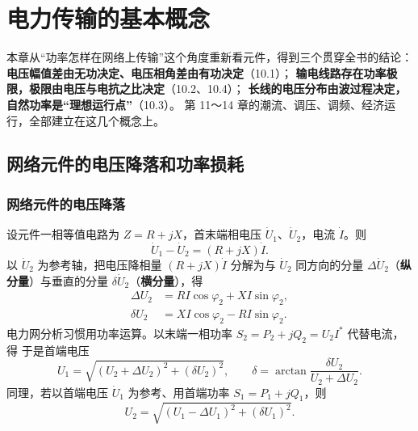 
\chapter{电力传输的基本概念}

本章从“功率怎样在网络上传输”这个角度重新看元件，得到三个贯穿全书的结论：
\textbf{电压幅值差由无功决定、电压相角差由有功决定}（10.1）；
\textbf{输电线路存在功率极限，极限由电压与电抗之比决定}（10.2、10.4）；
\textbf{长线的电压分布由波过程决定，自然功率是“理想运行点”}（10.3）。
第 11～14 章的潮流、调压、调频、经济运行，全部建立在这几个概念上。

\section{网络元件的电压降落和功率损耗}

\subsection{网络元件的电压降落}

设元件一相等值电路为 $Z=R+jX$，首末端相电压 $\dot U_1$、$\dot U_2$，电流 $\dot I$。则
\begin{equation}
  \dot U_1-\dot U_2=(R+jX)\dot I .
\end{equation}
以 $\dot U_2$ 为参考轴，把电压降相量 $(R+jX)\dot I$ 分解为与 $\dot U_2$ 同方向的分量
$\Delta\dot U_2$（\textbf{纵分量}）与垂直的分量 $\delta\dot U_2$（\textbf{横分量}），得
\begin{align}
  \Delta U_2&=RI\cos\varphi_2+XI\sin\varphi_2,\\
  \delta U_2&=XI\cos\varphi_2-RI\sin\varphi_2 .
\end{align}
电力网分析习惯用功率运算。以末端一相功率 $S_2=P_2+jQ_2=U_2I^{*}$ 代替电流，得
于是首端电压
\begin{equation}
  U_1=\sqrt{\left(U_2+\Delta U_2\right)^{2}+\left(\delta U_2\right)^{2}},
  \qquad \delta=\arctan\frac{\delta U_2}{U_2+\Delta U_2}.
\end{equation}
同理，若以首端电压 $\dot U_1$ 为参考、用首端功率 $S_1=P_1+jQ_1$，则
\begin{equation}
  U_2=\sqrt{\left(U_1-\Delta U_1\right)^{2}+\left(\delta U_1\right)^{2}} .
\end{equation}

